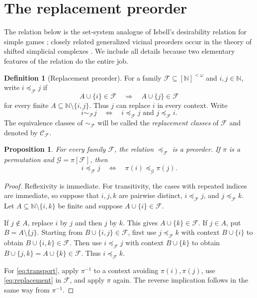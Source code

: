 \documentclass[11pt]{article}
\newtheorem{proposition}[theorem]{Proposition}
\theoremstyle{definition}
\newtheorem{definition}[theorem]{Definition}
\theoremstyle{remark}
\newcommand{\N}{\mathbb N}
\newcommand{\F}{\mathcal F}
\newcommand{\G}{\mathcal G}
\newcommand{\Ccal}{\mathcal C}
\begin{document}
\section{The replacement preorder}\label{sec:preorder}

The relation below is the set-system analogue of Isbell's desirability
relation for simple games \cite{Isbell}; closely related generalized vicinal
preorders occur in the theory of shifted simplicial complexes
\cite{Klivans}.  We include all details because two elementary features of
the relation do the entire job.

\begin{definition}[Replacement preorder]\label{def:replacement}
For a family $\F\subseteq[\N]^{<\omega}$ and $i,j\in\N$, write
$i\preccurlyeq_{\F}j$ if
\[
  A\cup\{i\}\in\F\quad\Longrightarrow\quad A\cup\{j\}\in\F
  \tag{2.1}\label{eq:replacement}
\]
for every finite $A\subseteq\N\setminus\{i,j\}$.  Thus $j$ can replace $i$
in every context.  Write
\[
  i\sim_{\F}j
  \quad\Longleftrightarrow\quad
  i\preccurlyeq_{\F}j\text{ and }j\preccurlyeq_{\F}i.
\]
The equivalence classes of $\sim_{\F}$ will be called the
\emph{replacement classes} of $\F$ and denoted by $\Ccal_{\F}$.
\end{definition}

\begin{proposition}\label{prop:preorder}
For every family $\F$, the relation $\preccurlyeq_{\F}$ is a preorder.  If
$\pi$ is a permutation and $\G=\pi[\F]$, then
\[
  i\preccurlyeq_{\F}j
  \quad\Longleftrightarrow\quad
  \pi(i)\preccurlyeq_{\G}\pi(j).
  \tag{2.2}\label{eq:transport}
\]
\end{proposition}

\begin{proof}
Reflexivity is immediate.  For transitivity, the cases with repeated indices
are immediate, so suppose that $i,j,k$ are pairwise distinct,
$i\preccurlyeq_{\F}j$, and $j\preccurlyeq_{\F}k$.  Let
$A\subseteq\N\setminus\{i,k\}$ be finite and suppose
$A\cup\{i\}\in\F$.

If $j\notin A$, replace $i$ by $j$ and then $j$ by $k$.  This gives
$A\cup\{k\}\in\F$.  If $j\in A$, put $B=A\setminus\{j\}$.  Starting from
$B\cup\{i,j\}\in\F$, first use $j\preccurlyeq_{\F}k$ with context
$B\cup\{i\}$ to obtain $B\cup\{i,k\}\in\F$.  Then use
$i\preccurlyeq_{\F}j$ with context $B\cup\{k\}$ to obtain
$B\cup\{j,k\}=A\cup\{k\}\in\F$.  Thus
$i\preccurlyeq_{\F}k$.

For \eqref{eq:transport}, apply $\pi^{-1}$ to a context avoiding
$\pi(i),\pi(j)$, use \eqref{eq:replacement} in $\F$, and apply $\pi$ again.
The reverse implication follows in the same way from $\pi^{-1}$.
\end{proof}
\end{document}
